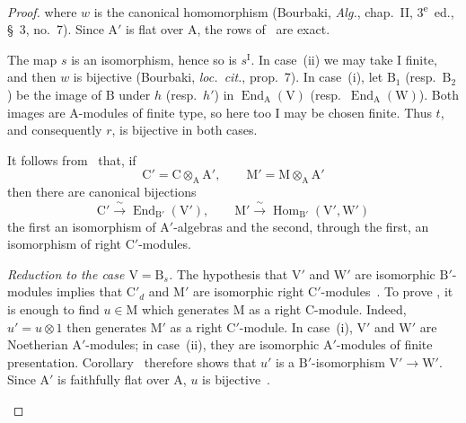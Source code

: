 \begin{proof}
where $w$ is the canonical homomorphism (Bourbaki, \emph{Alg.},
chap.~II, 3\textsuperscript{e}~ed., \S~3, no.~7). Since $\mathrm{A}'$
is flat over $\mathrm{A}$, the rows of~ are exact.


The map $s$ is an isomorphism, hence so is $s^{\mathrm{I}}$. In case~(ii)
we may take $\mathrm{I}$ finite, and then $w$ is bijective (Bourbaki,
\emph{loc.\ cit.}, prop.~7). In case~(i), let $\mathrm{B}_1$
\textnormal{(}resp.\ $\mathrm{B}_2$\textnormal{)} be the image of
$\mathrm{B}$ under $h$ \textnormal{(}resp.\ $h'$\textnormal{)} in
$\operatorname{End}_{\mathrm{A}}(\mathrm{V})$
\textnormal{(}resp.\
$\operatorname{End}_{\mathrm{A}}(\mathrm{W})$\textnormal{)}. Both
images are $\mathrm{A}$-modules of finite type, so here too
$\mathrm{I}$ may be chosen finite. Thus $t$, and consequently $r$, is
bijective in both cases.

\begin{env}[2.5.8.6]
\label{IV.2.5.8.6}
It follows from~ that, if
\[
  \mathrm{C}'=\mathrm{C}\otimes_{\mathrm{A}}\mathrm{A}',\qquad \mathrm{M}'=\mathrm{M}\otimes_{\mathrm{A}}\mathrm{A}'
\]
then there are canonical bijections
\[
  \mathrm{C}' \xrightarrow{\;\sim\;} \operatorname{End}_{\mathrm{B}'}(\mathrm{V}'),\qquad \mathrm{M}' \xrightarrow{\;\sim\;} \operatorname{Hom}_{\mathrm{B}'}(\mathrm{V}',\mathrm{W}')
\]
the first an isomorphism of $\mathrm{A}'$-algebras and the second,
through the first, an isomorphism of right $\mathrm{C}'$-modules.
\end{env}

\begin{env}[2.5.8.7]
\label{IV.2.5.8.7}
\emph{Reduction to the case $\mathrm{V}=\mathrm{B}_s$.}
The hypothesis that $\mathrm{V}'$ and $\mathrm{W}'$ are isomorphic
$\mathrm{B}'$-modules implies that $\mathrm{C}'_d$ and $\mathrm{M}'$
are isomorphic right $\mathrm{C}'$-modules~\sref{IV.2.5.6}. To prove
\sref{IV.2.5.8}, it is enough to find $u\in\mathrm{M}$ which generates
$\mathrm{M}$ as a right $\mathrm{C}$-module. Indeed,
$u'=u\otimes1$ then generates $\mathrm{M}'$ as a right
$\mathrm{C}'$-module. In case~(i), $\mathrm{V}'$ and $\mathrm{W}'$ are
Noetherian $\mathrm{A}'$-modules; in case~(ii), they are isomorphic
$\mathrm{A}'$-modules of finite presentation. Corollary~
therefore shows that $u'$ is a $\mathrm{B}'$-isomorphism
$\mathrm{V}'\to\mathrm{W}'$. Since $\mathrm{A}'$ is faithfully flat
over $\mathrm{A}$, $u$ is bijective~\sref[0]{0.6.4.1}.


\end{env}
\end{proof}

